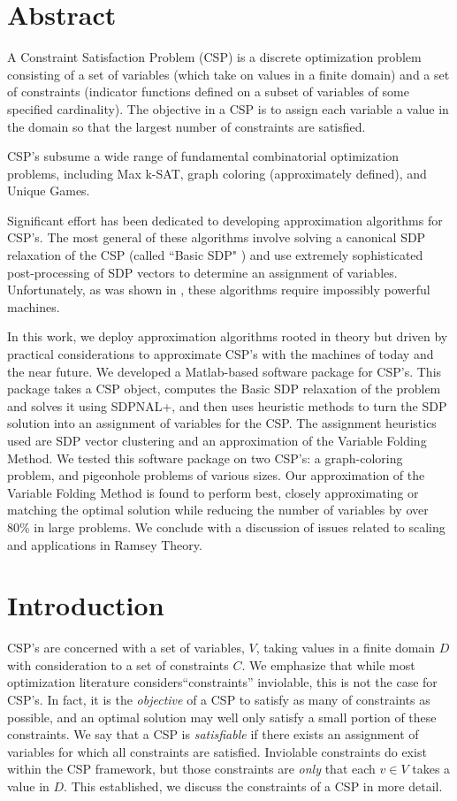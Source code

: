 \documentclass[12pt]{article} %
\begin{document}
\section*{Abstract}

A Constraint Satisfaction Problem (CSP) is a discrete optimization problem consisting of a set of variables (which take on values in a finite domain) and a set of constraints (indicator functions defined on a subset of variables of some specified cardinality). The objective in a CSP is to assign each variable a value in the domain so that the largest number of constraints are satisfied.

CSP's subsume a wide range of fundamental combinatorial optimization problems, including Max k-SAT, graph coloring (approximately defined), and Unique Games.

Significant effort has been dedicated to developing approximation algorithms for CSP's. The most general of these algorithms involve solving a canonical SDP relaxation of the CSP (called ``Basic SDP" \cite{raghavendra2008optimal}) and use extremely sophisticated post-processing of SDP vectors to determine an assignment of variables. Unfortunately, as was shown in \cite{dwivedi2015introduction}, these algorithms require impossibly powerful machines.

In this work, we deploy approximation algorithms rooted in theory but driven by practical considerations to approximate CSP's with the machines of today and the near future. We developed a Matlab-based software package for CSP's. This package takes a CSP object, computes the Basic SDP relaxation of the problem and solves it using SDPNAL+, and then uses heuristic methods to turn the SDP solution into an assignment of variables for the CSP.  The assignment heuristics used are SDP vector clustering and an approximation of the Variable Folding Method. We tested this software package on two CSP's: a graph-coloring problem, and pigeonhole problems of various sizes. Our approximation of the Variable Folding Method is found to perform best, closely approximating or matching the optimal solution while reducing the number of variables by over 80\% in large problems. We conclude with a discussion of issues related to scaling and applications in Ramsey Theory.

\section{Introduction}

CSP's are concerned with a set of variables, $V$, taking values in a finite domain $D$ with consideration to a set of constraints $C$. We emphasize that while most optimization literature considers``constraints'' inviolable, this is not the case for CSP's. In fact, it is the \textit{objective} of a CSP to satisfy as many of constraints as possible, and an optimal solution may well only satisfy a small portion of these constraints. We say that a CSP is \textit{satisfiable} if there exists an assignment of variables for which all constraints are satisfied. Inviolable constraints do exist within the CSP framework, but those constraints are \textit{only} that each $v \in V$ takes a value in $D$. This established, we discuss the constraints of a CSP in more detail. 
\end{document}
